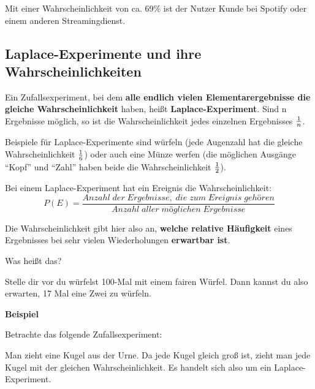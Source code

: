 \documentclass[
  ngerman,
]{book}
\begin{document}
Mit einer Wahrscheinlichkeit von ca. 69\% ist der Nutzer Kunde bei Spotify oder einem anderen Streamingdienst.

\hypertarget{section-85}{%
\subsubsection*{}\label{section-85}}

\hypertarget{section-86}{%
\subsubsection*{}\label{section-86}}

\hypertarget{laplace-experimente-und-ihre-wahrscheinlichkeiten}{%
\subsection*{Laplace-Experimente und ihre Wahrscheinlichkeiten}\label{laplace-experimente-und-ihre-wahrscheinlichkeiten}}

Ein Zufallsexperiment, bei dem \textbf{alle endlich vielen Elementarergebnisse die gleiche Wahrscheinlichkeit} haben, heißt \textbf{Laplace-Experiment}. Sind n Ergebnisse möglich, so ist die Wahrscheinlichkeit jedes einzelnen Ergebnisses \(1 \over n\).

Beispiele für Laplace-Experimente sind würfeln (jede Augenzahl hat die gleiche Wahrscheinlichkeit \(1 \over 6\)) oder auch eine Münze werfen (die möglichen Ausgänge ``Kopf'' und ``Zahl'' haben beide die Wahrscheinlichkeit \(1 \over 2\)).

Bei einem Laplace-Experiment hat ein Ereignis die Wahrscheinlichkeit:
\[P(E)=\frac{Anzahl\;der\;Ergebnisse,\;die\;zum\;Ereignis\;gehören}{Anzahl\;aller\;möglichen\;Ergebnisse}\]

Die Wahrscheinlichkeit gibt hier also an, \textbf{welche relative Häufigkeit} eines Ergebnisses bei sehr vielen Wiederholungen \textbf{erwartbar ist}.

Was heißt das?

Stelle dir vor du würfelst 100-Mal mit einem fairen Würfel. Dann kannst du also erwarten, 17 Mal eine Zwei zu würfeln.

\textbf{Beispiel}

Betrachte das folgende Zufallsexperiment:

Man zieht eine Kugel aus der Urne. Da jede Kugel gleich groß ist, zieht man jede Kugel mit der gleichen Wahrscheinlichkeit. Es handelt sich also um ein Laplace-Experiment.
\end{document}
